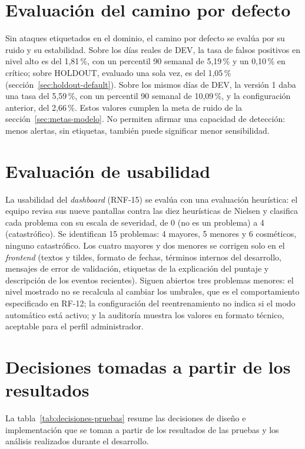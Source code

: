 \section{Evaluación del camino por defecto}
\label{sec:evaluacion-default}
Sin ataques etiquetados en el dominio, el camino por defecto se evalúa por su ruido y su estabilidad. Sobre los días reales de DEV, la tasa de falsos positivos en nivel alto es del 1,81\,\%, con un percentil 90 semanal de 5,19\,\% y un 0,10\,\% en crítico; sobre HOLDOUT, evaluado una sola vez, es del 1,05\,\% (sección~\ref{sec:holdout-default}). Sobre los mismos días de DEV, la versión 1 daba una tasa del 5,59\,\%, con un percentil 90 semanal de 10,09\,\%, y la configuración anterior, del 2,66\,\%. Estos valores cumplen la meta de ruido de la sección~\ref{sec:metas-modelo}. No permiten afirmar una capacidad de detección: menos alertas, sin etiquetas, también puede significar menor sensibilidad.

\section{Evaluación de usabilidad}
\label{sec:evaluacion-usabilidad}
La usabilidad del \emph{dashboard} (RNF-15) se evalúa con una evaluación heurística: el equipo revisa sus nueve pantallas contra las diez heurísticas de Nielsen \parencite{Nielsen1994} y clasifica cada problema con su escala de severidad, de 0 (no es un problema) a 4 (catastrófico). Se identifican 15 problemas: 4 mayores, 5 menores y 6 cosméticos, ninguno catastrófico. Los cuatro mayores y dos menores se corrigen solo en el \emph{frontend} (textos y tildes, formato de fechas, términos internos del desarrollo, mensajes de error de validación, etiquetas de la explicación del puntaje y descripción de los eventos recientes). Siguen abiertos tres problemas menores: el nivel mostrado no se recalcula al cambiar los umbrales, que es el comportamiento especificado en RF-12; la configuración del reentrenamiento no indica si el modo automático está activo; y la auditoría muestra los valores en formato técnico, aceptable para el perfil administrador.

\section{Decisiones tomadas a partir de los resultados}
\label{sec:decisiones-pruebas}
La tabla~\ref{tab:decisiones-pruebas} resume las decisiones de diseño e implementación que se toman a partir de los resultados de las pruebas y los análisis realizados durante el desarrollo.

